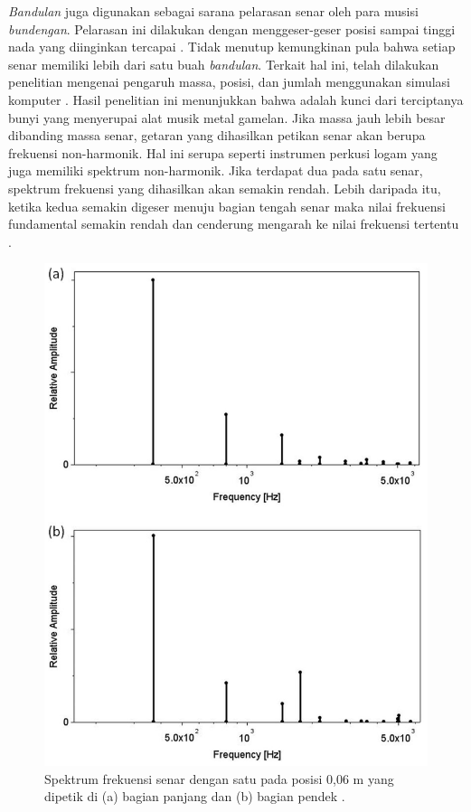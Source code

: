 \textit{Bandulan} juga digunakan sebagai sarana pelarasan senar oleh para musisi \textit{bundengan}. Pelarasan ini dilakukan dengan menggeser-geser posisi \bandulan sampai tinggi nada yang diinginkan tercapai \cite{skripsiSaid}. Tidak menutup kemungkinan pula bahwa setiap senar \bundengan memiliki lebih dari satu buah \textit{bandulan}. Terkait hal ini, telah dilakukan penelitian mengenai pengaruh massa, posisi, dan jumlah \bandulan menggunakan simulasi komputer \cite{paperGetaranBandulan}. Hasil penelitian ini menunjukkan bahwa \bandulan adalah kunci dari terciptanya bunyi yang menyerupai alat musik metal gamelan. Jika massa \bandulan jauh lebih besar dibanding massa senar, getaran yang dihasilkan petikan senar akan berupa frekuensi non-harmonik. Hal ini serupa seperti instrumen perkusi logam yang juga memiliki spektrum non-harmonik. Jika terdapat dua \bandulan pada satu senar, spektrum frekuensi yang dihasilkan akan semakin rendah. Lebih daripada itu, ketika kedua \bandulan semakin digeser menuju bagian tengah senar maka nilai frekuensi fundamental semakin rendah dan cenderung mengarah ke nilai frekuensi tertentu \cite{paperGetaranBandulan}. \par 
\begin{figure}[t!]
    \centering
    \includegraphics[width=8 cm]{Gambar/spekFrekBedaPetik.jpg}
    \caption{Spektrum frekuensi senar \bundengan dengan satu \bandulan pada posisi 0,06 m yang dipetik di (a) bagian panjang dan (b) bagian pendek \cite{paperGetaranBandulan}.}
    \label{fig:spekFrekBedaPetik}
\end{figure}
